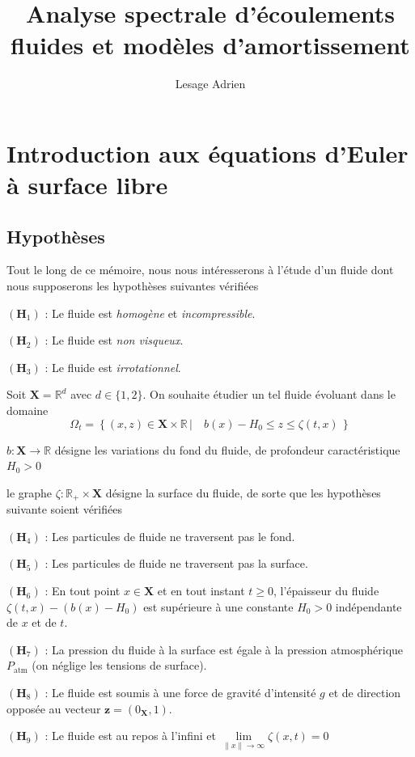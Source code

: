 \documentclass[12pt,a4paper]{article}
\numberwithin{equation}{section}
\begin{document}
\title{Analyse spectrale d'écoulements fluides et modèles d'amortissement}
\author{Lesage Adrien}
\maketitle
\newpage
\tableofcontents
\newpage
\section{Introduction aux équations d'Euler à surface libre}
\subsection{Hypothèses}

Tout le long de ce mémoire, nous nous intéresserons à l'étude d'un fluide dont nous supposerons les hypothèses suivantes vérifiées
\begin{list}{}{}
    \item[$(\textbf{H}_1)$ : ] Le fluide est \textit{homogène} et \textit{incompressible}.
    \item[$(\textbf{H}_2)$ : ] Le fluide est \textit{non visqueux}.
    \item[$(\textbf{H}_3)$ : ] Le fluide est \textit{irrotationnel}.
\end{list}

Soit $\textbf{X} = \mathbb{R}^d$ avec $d \in \{1,2\}$. On souhaite étudier un tel fluide évoluant dans le domaine $$\Omega_t = \left\{ (x,z) \in \textbf{X}\times\mathbb{R}  \,|\quad b(x) - H_0 \leq z \leq \zeta(t,x) \,\right\}$$
\begin{list}{}{}
\item[\textbullet] $b : \textbf{X}\rightarrow \mathbb{R}$ désigne les variations du fond du fluide, de profondeur caractéristique $H_0 > 0$
\item[\textbullet] le graphe $\zeta : \mathbb{R}_+\times \textbf{X}$ désigne la surface du fluide, de sorte que les hypothèses suivante soient vérifiées
\end{list}


\begin{list}{}{}
    \item[$(\textbf{H}_4)$ : ] Les particules de fluide ne traversent pas le fond.
    \item[$(\textbf{H}_5)$ : ] Les particules de fluide ne traversent pas la surface.
    \item[$(\textbf{H}_6)$ : ]  En tout point $x\in\textbf{X}$ et en tout instant $t\geq 0$, l'épaisseur du fluide $\zeta(t,x) - (b(x)-H_0)$ est supérieure à une constante $H_0>0$ indépendante de $x$ et de $t$.
    \item[$(\textbf{H}_7)$ : ] La pression  du fluide à la surface est égale à la pression atmosphérique $P_{\text{atm}}$ (on néglige les tensions de surface).
    \item[$(\textbf{H}_8)$ : ] Le fluide est soumis à une force de gravité d'intensité $g$ et de direction opposée au vecteur $\textbf{z} = (0_{\textbf{X}},1)$.
    \item[$(\textbf{H}_9)$ : ] Le fluide est au repos à l'infini et $\lim\limits_{\|x\|\rightarrow \infty}\zeta(x,t) = 0$
\end{list}
\end{document}
